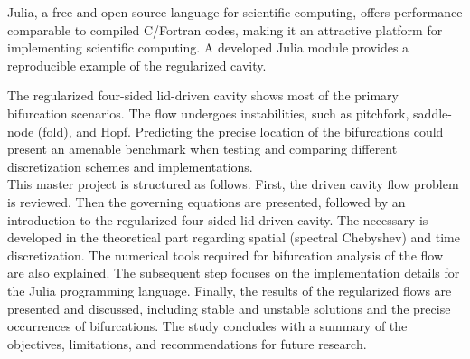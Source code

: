 Julia, a free and open-source language for scientific computing, offers
performance comparable to compiled C/Fortran codes, making it an attractive
platform for implementing scientific computing. A developed Julia module
provides a reproducible example of the regularized cavity.

The regularized four-sided lid-driven cavity shows most of the primary
bifurcation scenarios. The flow undergoes instabilities, such as pitchfork,
saddle-node (fold), and Hopf. Predicting the precise location of the
bifurcations could present an amenable benchmark when testing and comparing
different discretization schemes and implementations. \\

This master project is structured as follows. First, the driven cavity flow
problem is reviewed. Then the governing equations are presented, followed by an
introduction to the regularized four-sided lid-driven cavity. The necessary is
developed in the theoretical part regarding spatial (spectral Chebyshev) and
time discretization. The numerical tools required for bifurcation analysis of
the flow are also explained. The subsequent step focuses on the implementation
details for the Julia programming language. Finally, the results of the
regularized flows are presented and discussed, including stable and unstable
solutions and the precise occurrences of bifurcations. The study concludes with
a summary of the objectives, limitations, and recommendations for future
research.
